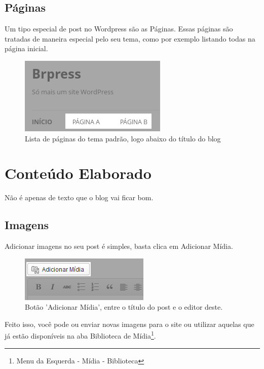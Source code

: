\documentclass[12pt,onecolumn]{article}
\begin{document}
	\subsection{Páginas}
		Um tipo especial de post no Wordpress são as Páginas.
		Essas páginas são tratadas de maneira especial pelo seu tema, como por
		exemplo listando todas na página inicial.
		\begin{figure}[H]
			\centering
			\includegraphics{page1.png}
			\caption{Lista de páginas do tema padrão, logo abaixo do título do blog}
		\end{figure}
		
\clearpage
\section{Conteúdo Elaborado}
	Não é apenas de texto que o blog vai ficar bom.
	\subsection{Imagens}
		Adicionar imagens no seu post é simples, basta clica em Adicionar Mídia.
		\begin{figure}[H]
			\centering
			\includegraphics{midia1.png}
			\caption{Botão 'Adicionar Mídia', entre o título do post e o editor deste.}
		\end{figure}
		Feito isso, você pode ou enviar novas imagens para o site ou utilizar 
		aquelas que já estão disponíveis na aba Biblioteca de Mídia\footnote{Menu da Esquerda - Mídia - Biblioteca}.
\end{document}
